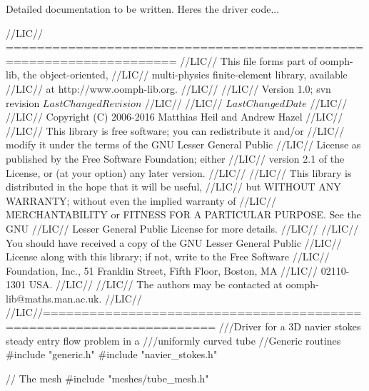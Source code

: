 Detailed documentation to be written. Here\textquotesingle{}s the driver code...


\begin{DoxyCodeInclude}
\textcolor{comment}{//LIC// ====================================================================}
\textcolor{comment}{//LIC// This file forms part of oomph-lib, the object-oriented, }
\textcolor{comment}{//LIC// multi-physics finite-element library, available }
\textcolor{comment}{//LIC// at http://www.oomph-lib.org.}
\textcolor{comment}{//LIC// }
\textcolor{comment}{//LIC//    Version 1.0; svn revision $LastChangedRevision$}
\textcolor{comment}{//LIC//}
\textcolor{comment}{//LIC// $LastChangedDate$}
\textcolor{comment}{//LIC// }
\textcolor{comment}{//LIC// Copyright (C) 2006-2016 Matthias Heil and Andrew Hazel}
\textcolor{comment}{//LIC// }
\textcolor{comment}{//LIC// This library is free software; you can redistribute it and/or}
\textcolor{comment}{//LIC// modify it under the terms of the GNU Lesser General Public}
\textcolor{comment}{//LIC// License as published by the Free Software Foundation; either}
\textcolor{comment}{//LIC// version 2.1 of the License, or (at your option) any later version.}
\textcolor{comment}{//LIC// }
\textcolor{comment}{//LIC// This library is distributed in the hope that it will be useful,}
\textcolor{comment}{//LIC// but WITHOUT ANY WARRANTY; without even the implied warranty of}
\textcolor{comment}{//LIC// MERCHANTABILITY or FITNESS FOR A PARTICULAR PURPOSE.  See the GNU}
\textcolor{comment}{//LIC// Lesser General Public License for more details.}
\textcolor{comment}{//LIC// }
\textcolor{comment}{//LIC// You should have received a copy of the GNU Lesser General Public}
\textcolor{comment}{//LIC// License along with this library; if not, write to the Free Software}
\textcolor{comment}{//LIC// Foundation, Inc., 51 Franklin Street, Fifth Floor, Boston, MA}
\textcolor{comment}{//LIC// 02110-1301  USA.}
\textcolor{comment}{//LIC// }
\textcolor{comment}{//LIC// The authors may be contacted at oomph-lib@maths.man.ac.uk.}
\textcolor{comment}{//LIC// }
\textcolor{comment}{//LIC//====================================================================}\textcolor{comment}{}
\textcolor{comment}{///Driver for a 3D navier stokes steady entry flow problem in a }
\textcolor{comment}{///uniformly curved tube}
\textcolor{comment}{}
\textcolor{comment}{//Generic routines}
\textcolor{preprocessor}{#include "generic.h"}
\textcolor{preprocessor}{#include "navier\_stokes.h"}

\textcolor{comment}{// The mesh}
\textcolor{preprocessor}{#include "meshes/tube\_mesh.h"}


\end{DoxyCodeInclude}
